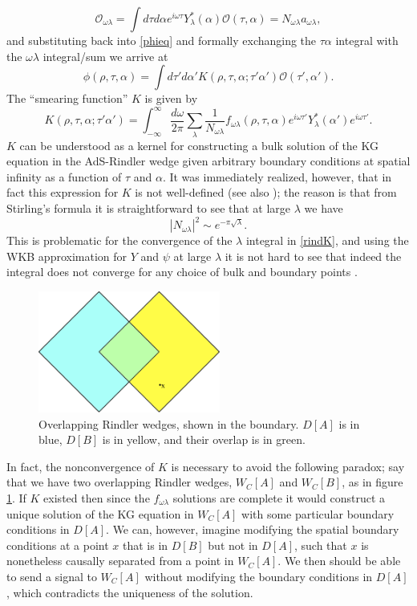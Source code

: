 \documentclass[11pt]{article}
\newcommand{\be}{\begin{equation}}
\newcommand{\ee}{\end{equation}}
\newcommand{\mO}{\mathcal{O}}
\begin{document}
\be
\mO_{\omega \lambda} = \int d\tau d\alpha e^{i \omega \tau}Y_\lambda^*(\alpha)\mO(\tau,\alpha)=N_{\omega \lambda} a_{\omega \lambda},
\ee
and substituting back into \eqref{phieq} and formally exchanging the $\tau\alpha$ integral with the $\omega \lambda$ integral/sum we arrive at
\be
\phi(\rho,\tau,\alpha)=\int d\tau' d\alpha' K(\rho,\tau,\alpha; \tau'\alpha') \mO(\tau',\alpha').
\ee
The ``smearing function'' $K$ is given by
\be\label{rindK}
K(\rho,\tau,\alpha; \tau'\alpha')=\int_{-\infty}^\infty \frac{d\omega}{2\pi}\sum_\lambda \frac{1}{N_{\omega \lambda}}f_{\omega \lambda}(\rho,\tau,\alpha)e^{i\omega \tau'}Y^*_\lambda(\alpha')e^{i\omega \tau'}.
\ee
$K$ can be understood as a kernel for constructing a bulk solution of the KG equation in the AdS-Rindler wedge given arbitrary boundary conditions at spatial infinity as a function of $\tau$ and $\alpha$.  It was immediately realized, however, that in fact this expression for $K$ is not well-defined \cite{Hamilton:2006az} (see also \cite{Leichenauer:2013kaa,Rey:2014dpa}); the reason is that from Stirling's formula it is straightforward to see that at large $\lambda$ we have
\be
|N_{\omega \lambda}|^2\sim e^{-\pi \sqrt{\lambda}}.
\ee 
This is problematic for the convergence of the $\lambda$ integral in \eqref{rindK}, and using the WKB approximation for $Y$ and $\psi$ at large $\lambda$ it is not hard to see that indeed the integral does not converge for any choice of bulk and boundary points \cite{Leichenauer:2013kaa,Rey:2014dpa,Morrison:2014jha}.

\begin{figure}
\begin{center}
\includegraphics[height=4cm]{overlap.pdf}
\caption{Overlapping Rindler wedges, shown in the boundary.  $D[A]$ is in blue, $D[B]$ is in yellow, and their overlap is in green.}\label{overlap}
\end{center}
\end{figure}
In fact, the nonconvergence of $K$ is necessary to avoid the following paradox; say that we have two overlapping Rindler wedges, $W_C[A]$ and $W_C[B]$, as in figure \ref{overlap}.  If $K$ existed then since the $f_{\omega\lambda}$ solutions are complete it would construct a unique solution of the KG equation in $W_C[A]$ with some particular boundary conditions in $D[A]$.  We can, however, imagine modifying the spatial boundary conditions at a point $x$ that is in $D[B]$ but not in $D[A]$, such that $x$ is nonetheless causally separated from a point in $W_C[A]$.  We then should be able to send a signal to $W_C[A]$ without modifying the boundary conditions in $D[A]$, which contradicts the uniqueness of the solution.  
\end{document}
